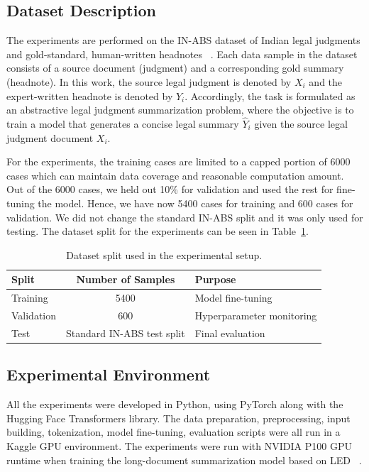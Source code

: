 \documentclass[11pt, a4paper]{article}
\theoremstyle{plain}%
\theoremstyle{remark}%
\theoremstyle{definition}%
\begin{document}
\subsection{Dataset Description}
The experiments are performed on the IN-ABS dataset of Indian legal judgments and gold-standard, human-written headnotes ~\cite{b1}. Each data sample in the dataset consists of a source document (judgment) and a corresponding gold summary (headnote). In this work, the source legal judgment is denoted by $X_i$ and the expert-written headnote is denoted by $Y_i$. Accordingly, the task is formulated as an abstractive legal judgment summarization problem, where the objective is to train a model that generates a concise legal summary $\hat{Y}_i$ given the source legal judgment document $X_i$.

For the experiments, the training cases are limited to a capped portion of 6000 cases which can maintain data coverage and reasonable computation amount. Out of the 6000 cases, we held out 10\% for validation and used the rest for fine-tuning the model. Hence, we have now 5400 cases for training and 600 cases for validation. We did not change the standard IN-ABS split and it was only used for testing. The dataset split for the experiments can be seen in Table~\ref{tab:dataset_split}.

\begin{table}[H]
\centering
\caption{Dataset split used in the experimental setup.}
\begin{tabular}{lcl}
\hline
Split & Number of Samples & Purpose \\
\hline
Training & 5400 & Model fine-tuning \\
Validation & 600 & Hyperparameter monitoring \\
Test & Standard IN-ABS test split & Final evaluation \\
\hline
\end{tabular}
\label{tab:dataset_split}
\end{table}

\subsection{Experimental Environment}
All the experiments were developed in Python, using PyTorch along with the Hugging Face Transformers library. The data preparation, preprocessing, input building, tokenization, model fine-tuning, evaluation scripts were all run in a Kaggle GPU environment. The experiments were run with NVIDIA P100 GPU runtime when training the long-document summarization model based on LED ~\cite{b21}.
\end{document}
